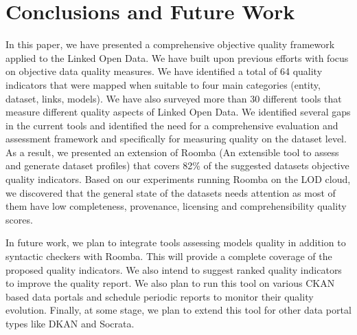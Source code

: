 





\section{Conclusions and Future Work}
In this paper, we have presented a comprehensive objective quality framework applied to the Linked Open Data. We have built upon previous efforts with focus on objective data quality measures. We have identified a total of 64 quality indicators that were mapped when suitable to four main categories (entity, dataset, links, models). We have also surveyed more than 30 different tools that measure different quality aspects of Linked Open Data. We identified several gaps in the current tools and identified the need for a comprehensive evaluation and assessment framework and specifically for measuring quality on the dataset level. As a result, we presented an extension of Roomba (An extensible tool to assess and generate dataset profiles) that covers 82\% of the suggested datasets objective quality indicators. Based on our experiments running Roomba on the LOD cloud, we discovered that the general state of the datasets needs attention as most of them have low completeness, provenance, licensing and comprehensibility quality scores.

In future work, we plan to integrate tools assessing models quality in addition to syntactic checkers with Roomba. This will provide a complete coverage of the proposed quality indicators. We also intend to suggest ranked quality indicators to improve the quality report. We also plan to run this tool on various CKAN based data portals and schedule periodic reports to monitor their quality evolution. Finally, at some stage, we plan to extend this tool for other data portal types like DKAN and Socrata.
